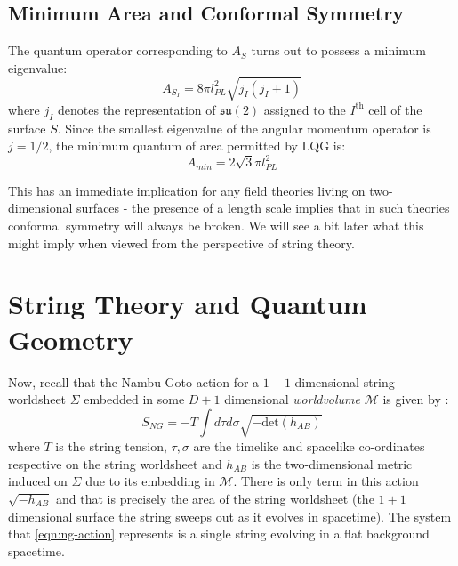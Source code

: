 \documentclass[a4paper]{article}
\newcommand{\mc}[1]{\mathcal{#1}}
\newcommand{\mf}[1]{\mathfrak{#1}}
\begin{document}
\subsection{Minimum Area and Conformal Symmetry}\label{sec:conformal}

The quantum operator corresponding to $ A_S $ turns out to possess a minimum eigenvalue:
\begin{equation}\label{eqn:area-eigenvalue}
	A_{S_I} = 8\pi l^2_{PL} \sqrt{j_I (j_I + 1)}
\end{equation}
where $ j_I $ denotes the representation of $ \mf{su}(2) $ assigned to the $ I^{\text{th}} $ cell of the surface $ S $. Since the smallest eigenvalue of the angular momentum operator is $ j = 1/2 $, the minimum quantum of area permitted by LQG is:
\begin{equation}\label{eqn:area-minimum}
	A_{min} = 2 \sqrt{3} \pi l^2_{PL} 
\end{equation}

This has an immediate implication for any field theories living on two-dimensional surfaces - the presence of a length scale implies that in such theories conformal symmetry will always be broken. We will see a bit later what this might imply when viewed from the perspective of string theory.

\section{String Theory and Quantum Geometry}\label{sec:string-geometry}

Now, recall that the Nambu-Goto action for a $ 1+1 $ dimensional string worldsheet $ \Sigma $ embedded in some $ D+1 $ dimensional \emph{worldvolume} $ \mc{M} $ is given by \cite{t-Hooft2004Introduction,Tong2010Lectures,Zwiebach2009A-First}:
\begin{equation}\label{eqn:ng-action}
	S_{NG} = -T \int d\tau d\sigma \sqrt{-\text{det} (h_{AB})}
\end{equation}
where $ T $ is the string tension, $ \tau, \sigma $ are the timelike and spacelike co-ordinates respective on the string worldsheet and $ h_{AB} $ is the two-dimensional metric induced on $ \Sigma $ due to its embedding in $ \mc{M} $. There is only term in this action $ \sqrt{-h_{AB}} $ and that is precisely the area of the string worldsheet (the $ 1+1 $ dimensional surface the string sweeps out as it evolves in spacetime). The system that \eqref{eqn:ng-action} represents is a single string evolving in a flat background spacetime.
\end{document}
